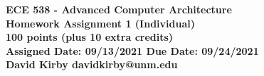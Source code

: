\documentclass[addpoints,12pt]{exam}
\begin{document}
\setmonofont{SF Mono}

\begin{center}
 	\large\bfseries ECE 538 - Advanced Computer Architecture\\[0.5em]
    Homework Assignment 1 (Individual)\\[1em]
    100 points (plus 10 extra credits)\\[1em]
    Assigned Date: \textnormal{09/13/2021} Due Date: \textnormal{09/24/2021}\\[5em]
    David Kirby \quad davidkirby@unm.edu
    \\[5em]
    \textnormal{
    \combinedgradetable[v][questions]}
    \end{center}
    \pagestyle{headandfoot}
    \firstpagefooter{}{\thepage}{}
    \runningfooter{}{\thepage}{}
    \newpage
\end{document}
